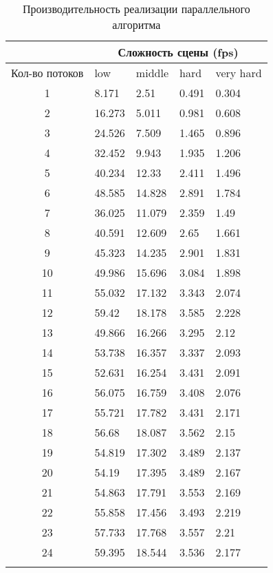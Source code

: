 \begin{center}
\begin{longtable}{|c|p{2cm}|p{2cm}|p{2cm}|p{2cm}|}
\hline & \multicolumn{4}{c|}{Сложность сцены (fps)} \\ 
\hline Кол-во потоков & low & middle & hard &  very hard\\ 
\hline 1 &  8.171 & 2.51 & 0.491 & 0.304 \\ 
\hline 2 &  16.273 & 5.011 & 0.981 & 0.608 \\ 
\hline 3 &  24.526 & 7.509 & 1.465 & 0.896 \\ 
\hline 4 &  32.452 & 9.943 & 1.935 & 1.206 \\ 
\hline 5 &  40.234 & 12.33 & 2.411 & 1.496 \\ 
\hline 6 &  48.585 & 14.828 & 2.891 & 1.784 \\ 
\hline 7 &  36.025 & 11.079 & 2.359 & 1.49 \\ 
\hline 8 &  40.591 & 12.609 & 2.65 & 1.661 \\ 
\hline 9 &  45.323 & 14.235 & 2.901 & 1.831 \\ 
\hline 10 &  49.986 & 15.696 & 3.084 & 1.898 \\ 
\hline 11 &  55.032 & 17.132 & 3.343 & 2.074 \\ 
\hline 12 &  59.42 & 18.178 & 3.585 & 2.228 \\ 
\hline 13 &  49.866 & 16.266 & 3.295 & 2.12 \\ 
\hline 14 &  53.738 & 16.357 & 3.337 & 2.093 \\ 
\hline 15 &  52.631 & 16.254 & 3.431 & 2.091 \\ 
\hline 16 &  56.075 & 16.759 & 3.408 & 2.076 \\ 
\hline 17 &  55.721 & 17.782 & 3.431 & 2.171 \\ 
\hline 18 &  56.68 & 18.087 & 3.562 & 2.15 \\ 
\hline 19 &  54.819 & 17.302 & 3.489 & 2.137 \\ 
\hline 20 &  54.19 & 17.395 & 3.489 & 2.167 \\ 
\hline 21 &  54.863 & 17.791 & 3.553 & 2.169 \\ 
\hline 22 &  55.858 & 17.456 & 3.493 & 2.219 \\ 
\hline 23 &  57.733 & 17.768 & 3.557 & 2.21 \\ 
\hline 24 &  59.395 & 18.544 & 3.536 & 2.177 \\ 
\hline
\caption{Производительность реализации параллельного алгоритма}\label{tab:perf_parallel_alg}
\end{longtable}
\end{center}